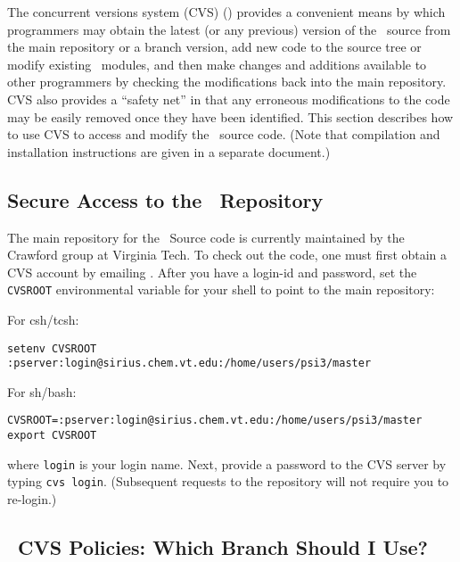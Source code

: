 %
%
%
%

The concurrent versions system (CVS) () provides a convenient means by
which programmers may obtain the latest (or any previous) version of the
\PSIthree\ source from the main repository or a branch version, add new
code to the source tree or modify existing \PSIthree\ modules, and then
make changes and additions available to other programmers by checking the
modifications back into the main repository.  CVS also provides a ``safety
net'' in that any erroneous modifications to the code may be easily removed
once they have been identified.  This section describes how to use CVS to
access and modify the \PSIthree\ source code.  (Note that compilation and
installation instructions are given in a separate document.)

\subsection{Secure Access to the \PSIthree\ Repository} The main repository
for the \PSIthree\ Source code is currently maintained by the Crawford group
at Virginia Tech.  To check out the code, one must first obtain a CVS account
by emailing .
After you have a login-id and password, set the {\tt CVSROOT} environmental
variable for your shell to point to the main repository:

\noindent
For csh/tcsh:
\begin{verbatim}
setenv CVSROOT :pserver:login@sirius.chem.vt.edu:/home/users/psi3/master
\end{verbatim}

\noindent
For sh/bash:
\begin{verbatim}
CVSROOT=:pserver:login@sirius.chem.vt.edu:/home/users/psi3/master
export CVSROOT
\end{verbatim}

\noindent where {\tt login} is your login name.  Next, provide a password
to the CVS server by typing {\tt cvs login}.  (Subsequent requests to the
repository will not require you to re-login.)

\subsection{\PSIthree\ CVS Policies: Which Branch Should I Use?}
\label{section:branches}

